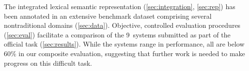 \documentclass[11pt,letterpaper]{article}
\newcommand{\ensuretext}[1]{#1}
\newcommand{\nssmarker}{\ensuretext{\textcolor{magenta}{\ensuremath{^{\textsc{NS}}_{\textsc{S}}}}}}
\newcommand{\arkcomment}[3]{\ensuretext{\textcolor{#3}{[#1 #2]}}}
\newcommand{\nss}[1]{\arkcomment{\nssmarker}{#1}{magenta}}
\begin{document}

The integrated lexical semantic representation (\cref{sec:integration}, \cref{sec:rep})
has been annotated in an extensive benchmark dataset comprising several nontraditional domains (\cref{sec:data}).
Objective, controlled evaluation procedures (\cref{sec:eval})
facilitate a comparison of the 9~systems submitted as part of the official task (\cref{sec:results}).
While the systems range in performance, all are below 60\% in our composite evaluation, 
suggesting that further work is needed to make progress on this difficult task.




\end{document}
